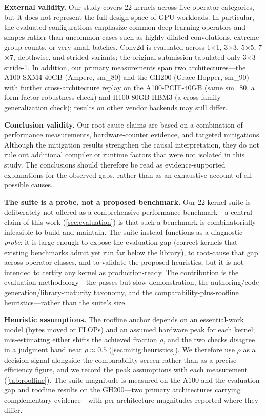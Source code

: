 \textbf{External validity.}
Our study covers 22 kernels across five operator categories, but it does not represent the full design space of GPU workloads. In particular, the evaluated configurations emphasize common deep learning operators and shapes rather than uncommon cases such as highly dilated convolutions, extreme group counts, or very small batches. Conv2d is evaluated across 1$\times$1, 3$\times$3, 5$\times$5, 7$\times$7, depthwise, and strided variants; the original submission tabulated only 3$\times$3 stride-1.
In addition, our primary measurements span two architectures---the A100-SXM4-40GB (Ampere, sm\_80) and the GH200 (Grace Hopper, sm\_90)---with further cross-architecture replay on the A100-PCIE-40GB (same sm\_80, a form-factor robustness check) and H100-80GB-HBM3 (a cross-family generalization check); results on other vendor backends may still differ.

\textbf{Conclusion validity.}
Our root-cause claims are based on a combination of performance measurements, hardware-counter evidence, and targeted mitigations. Although the mitigation results strengthen the causal interpretation, they do not rule out additional compiler or runtime factors that were not isolated in this study. The conclusions should therefore be read as evidence-supported explanations for the observed gaps, rather than as an exhaustive account of all possible causes.

\textbf{The suite is a probe, not a proposed benchmark.}
Our 22-kernel suite is deliberately not offered as a comprehensive performance benchmark---a central claim of this work (\cref{sec:evaluation}) is that such a benchmark is combinatorially infeasible to build and maintain. The suite instead functions as a diagnostic \emph{probe}: it is large enough to expose the evaluation gap (correct kernels that existing benchmarks admit yet run far below the library), to root-cause that gap across operator classes, and to validate the proposed heuristics, but it is not intended to certify any kernel as production-ready. The contribution is the evaluation methodology---the passes-but-slow demonstration, the authoring/code-generation/library-maturity taxonomy, and the comparability-plus-roofline heuristics---rather than the suite's size.

\textbf{Heuristic assumptions.}
The roofline anchor depends on an essential-work model (bytes moved or FLOPs) and an assumed hardware peak for each kernel; mis-estimating either shifts the achieved fraction $\rho$, and the two checks disagree in a judgment band near $\rho\approx0.5$ (\cref{sec:mitig:heuristics}). We therefore use $\rho$ as a decision signal alongside the comparability screen rather than as a precise efficiency figure, and we record the peak assumptions with each measurement (\cref{tab:roofline}). The suite magnitude is measured on the A100 and the evaluation-gap and roofline results on the GH200---two primary architectures carrying complementary evidence---with per-architecture magnitudes reported where they differ.